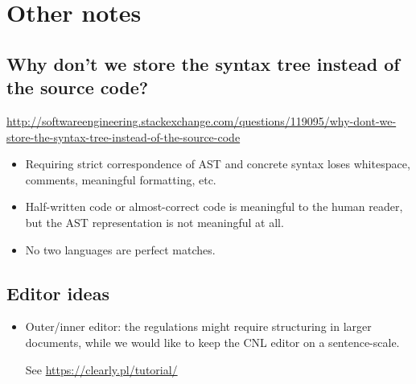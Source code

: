\documentclass[]{article}
\providecommand{\tightlist}{%
  \setlength{\itemsep}{0pt}\setlength{\parskip}{0pt}}
\begin{document}
\pagebreak

\section{Other notes}\label{other-notes}

\subsection{Why don't we store the syntax tree instead of the source
code?}\label{why-dont-we-store-the-syntax-tree-instead-of-the-source-code}

\url{http://softwareengineering.stackexchange.com/questions/119095/why-dont-we-store-the-syntax-tree-instead-of-the-source-code}

\begin{itemize}
\tightlist
\item
  Requiring strict correspondence of AST and concrete syntax loses
  whitespace, comments, meaningful formatting, etc.
\item
  Half-written code or almost-correct code is meaningful to the human
  reader, but the AST representation is not meaningful at all.
\item
  No two languages are perfect matches.
\end{itemize}

\subsection{Editor ideas}\label{editor-ideas}

\begin{itemize}
\item
  Outer/inner editor: the regulations might require structuring in
  larger documents, while we would like to keep the CNL editor on a
  sentence-scale.

  See \url{https://clearly.pl/tutorial/}
\end{itemize}
\end{document}
